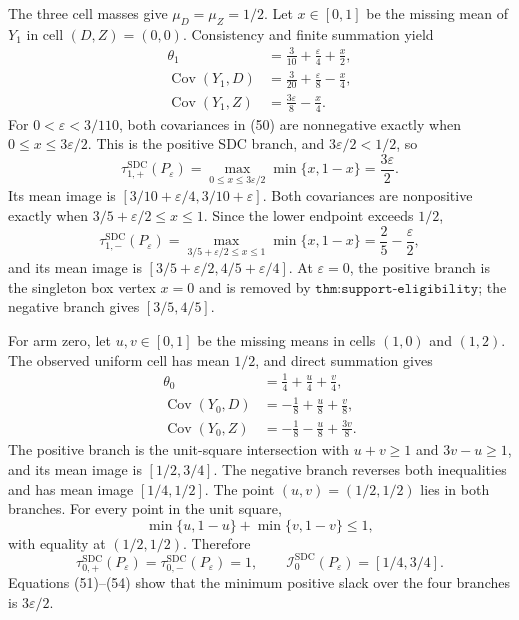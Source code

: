 The three cell masses give \(\mu_D=\mu_Z=1/2\).  Let \(x\in[0,1]\) be the missing mean of \(Y_1\) in cell \((D,Z)=(0,0)\).  Consistency and finite summation yield
\[
 \begin{aligned}
 \theta_1&=\frac3{10}+\frac{\varepsilon}{4}+\frac{x}{2},\\
 \operatorname{Cov}(Y_1,D)&=\frac3{20}+\frac{\varepsilon}{8}-\frac{x}{4},\\
 \operatorname{Cov}(Y_1,Z)&=\frac{3\varepsilon}{8}-\frac{x}{4}.
 \end{aligned}                                                               \tag{50}
\]
For \(0<\varepsilon<3/110\), both covariances in (50) are nonnegative exactly when \(0\le x\le3\varepsilon/2\).  This is the positive SDC branch, and \(3\varepsilon/2<1/2\), so
\[
 \tau_{1,+}^{\mathrm{SDC}}(P_\varepsilon)
 =\max_{0\le x\le3\varepsilon/2}\min\{x,1-x\}
 =\frac{3\varepsilon}{2}.                                                     \tag{51}
\]
Its mean image is \([3/10+\varepsilon/4,3/10+\varepsilon]\).  Both covariances are nonpositive exactly when
\(3/5+\varepsilon/2\le x\le1\).  Since the lower endpoint exceeds \(1/2\),
\[
 \tau_{1,-}^{\mathrm{SDC}}(P_\varepsilon)
 =\max_{3/5+\varepsilon/2\le x\le1}\min\{x,1-x\}
 =\frac25-\frac{\varepsilon}{2},                                             \tag{52}
\]
and its mean image is \([3/5+\varepsilon/2,4/5+\varepsilon/4]\).  At \(\varepsilon=0\), the positive branch is the singleton box vertex \(x=0\) and is removed by \(\texttt{thm:support-eligibility}\); the negative branch gives \([3/5,4/5]\).

For arm zero, let \(u,v\in[0,1]\) be the missing means in cells \((1,0)\) and \((1,2)\).  The observed uniform cell has mean \(1/2\), and direct summation gives
\[
 \begin{aligned}
 \theta_0&=\frac14+\frac{u}{4}+\frac{v}{4},\\
 \operatorname{Cov}(Y_0,D)&=-\frac18+\frac{u}{8}+\frac{v}{8},\\
 \operatorname{Cov}(Y_0,Z)&=-\frac18-\frac{u}{8}+\frac{3v}{8}.
 \end{aligned}                                                               \tag{53}
\]
The positive branch is the unit-square intersection with \(u+v\ge1\) and \(3v-u\ge1\), and its mean image is \([1/2,3/4]\).  The negative branch reverses both inequalities and has mean image \([1/4,1/2]\).  The point \((u,v)=(1/2,1/2)\) lies in both branches.  For every point in the unit square,
\[
 \min\{u,1-u\}+\min\{v,1-v\}\le1,
\]
with equality at \((1/2,1/2)\).  Therefore
\[
 \tau_{0,+}^{\mathrm{SDC}}(P_\varepsilon)
 =\tau_{0,-}^{\mathrm{SDC}}(P_\varepsilon)=1,
 \qquad
 \mathcal I_0^{\mathrm{SDC}}(P_\varepsilon)=[1/4,3/4].                       \tag{54}
\]
Equations (51)--(54) show that the minimum positive slack over the four branches is \(3\varepsilon/2\).

